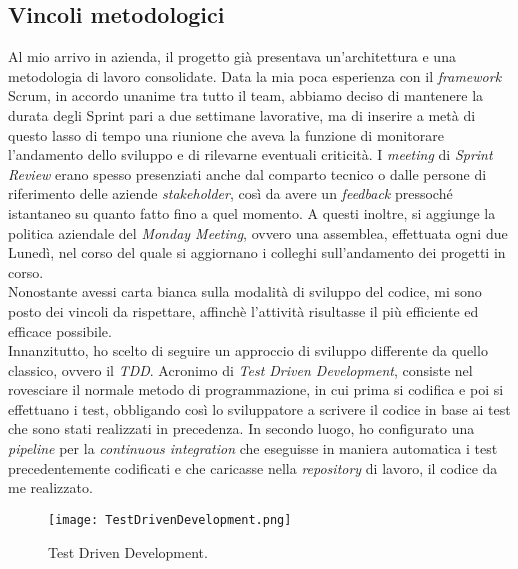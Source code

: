\subsection{Vincoli metodologici}
Al mio arrivo in azienda, il progetto già presentava un'architettura e una metodologia di lavoro consolidate.
Data la mia poca esperienza con il \textit{framework} Scrum, in accordo unanime tra tutto il team, abbiamo deciso di mantenere la durata degli Sprint pari a due settimane lavorative, ma di inserire a metà di questo lasso di tempo una riunione che aveva la funzione di monitorare l'andamento dello sviluppo e di rilevarne eventuali criticità. I \textit{meeting} di \textit{Sprint Review} erano spesso presenziati anche dal comparto tecnico o dalle persone di riferimento delle aziende \textit{stakeholder}, così da avere un \textit{feedback} pressoché istantaneo su quanto fatto fino a quel momento.
A questi inoltre, si aggiunge la politica aziendale del \textit{Monday Meeting}, ovvero una assemblea, effettuata ogni due Lunedì, nel corso del quale si aggiornano i colleghi sull'andamento dei progetti in corso.\\
Nonostante avessi carta bianca sulla modalità di sviluppo del codice, mi sono posto dei vincoli da rispettare, affinchè l'attività risultasse il più efficiente ed efficace possibile.\\
Innanzitutto, ho scelto di seguire un approccio di sviluppo differente da quello classico, ovvero il \textit{TDD}. Acronimo di \textit{Test Driven Development}, consiste nel rovesciare il normale metodo di programmazione, in cui prima si codifica e poi si effettuano i test, obbligando così lo sviluppatore a scrivere il codice in base ai test che sono stati realizzati in precedenza.
In secondo luogo, ho configurato una \textit{pipeline} per la \textit{continuous integration} che eseguisse in maniera automatica i test precedentemente codificati e che caricasse nella \textit{repository} di lavoro, il codice da me realizzato.
\begin{figure}[h]
\texttt{[image: TestDrivenDevelopment.png]}
\centering
\caption{Test Driven Development.} 
\label{fig:tdd}
\end{figure}
